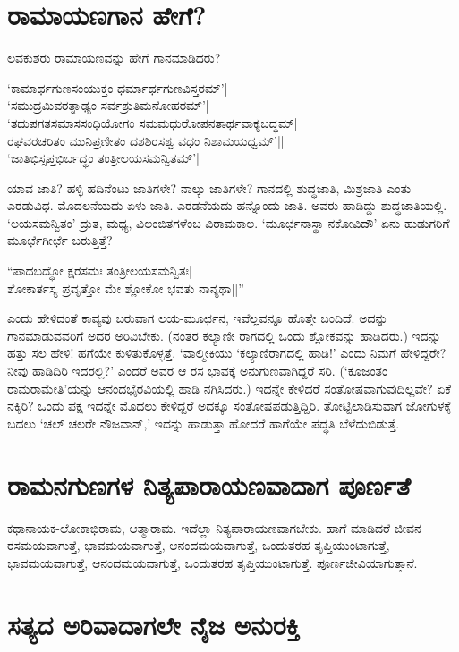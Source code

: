 \section*{ರಾಮಾಯಣಗಾನ ಹೇಗೆ?}

ಲವಕುಶರು ರಾಮಾಯಣವನ್ನು ಹೇಗೆ ಗಾನಮಾಡಿದರು?

\begin{shloka}
`ಕಾಮಾರ್ಥಗುಣಸಂಯುಕ್ತಂ ಧರ್ಮಾರ್ಥಗುಣವಿಸ್ತರಮ್'|\\
`ಸಮುದ್ರಮಿವರತ್ನಾಢ್ಯಂ ಸರ್ವಶ್ರುತಿಮನೋಹರಮ್'|\\
`ತದುಪಗತಸಮಾಸಸಂಧಿಯೋಗಂ ಸಮಮಧುರೋಪನತಾರ್ಥವಾಕ್ಯಬದ್ಧಮ್|\\
ರಘವರಚರಿತಂ ಮುನಿಪ್ರಣೀತಂ ದಶಶಿರಸಶ್ವ ವಧಂ ನಿಶಾಮಯಧ್ವಮ್'||\\
`ಜಾತಿಭಿಸ್ಸಪ್ತಭಿರ್ಬದ್ಧಂ ತಂತ್ರೀಲಯಸಮನ್ವಿತಮ್'|
\end{shloka}

ಯಾವ ಜಾತಿ? ಹಳ್ಳಿ ಹದಿನೆಂಟು 
ಜಾತಿಗಳೇ? ನಾಲ್ಕು ಜಾತಿಗಳೇ? 
ಗಾನದಲ್ಲಿ ಶುದ್ಧಜಾತಿ, 
ಮಿಶ್ರಜಾತಿ ಎಂತು ಎರಡುವಿಧ. 
ಮೊದಲನೆಯದು ಏಳು ಜಾತಿ. 
ಎರಡನೆಯದು ಹನ್ನೊಂದು ಜಾತಿ. 
ಅವರು ಹಾಡಿದ್ದು 
ಶುದ್ಧಜಾತಿಯಲ್ಲಿ. 
`ಲಯಸಮನ್ವಿತಂ' ದ್ರುತ, ಮಧ್ಯ, 
ವಿಲಂಬಿತಗಳೆಂಬ ವಿರಾಮಕಾಲ. 
`ಮೂರ್ಛನಾಸ್ಥಾ ನಕೋವಿದೌ' ಏನು ಹುಡುಗರಿಗೆ ಮೂರ್ಛೆಗೀರ್ಛೆ ಬರುತ್ತಿತ್ತೆ? 

\begin{shloka}
``ಪಾದಬದ್ಧೋ ಕ್ಷರಸಮಃ ತಂತ್ರೀಲಯಸಮನ್ವಿತಃ|\\
ಶೋಕಾರ್ತಸ್ಯ ಪ್ರವೃತ್ತೋ ಮೇ ಶ್ಲೋಕೋ ಭವತು ನಾನ್ಯಥಾ||''
\end{shloka}
ಎಂದು ಹೇಳಿದಂತೆ ಕಾವ್ಯವು 
ಬರುವಾಗ ಲಯ-ಮೂರ್ಛನ, 
ಇವೆಲ್ಲವನ್ನೂ ಹೊತ್ತೇ 
ಬಂದಿದೆ. ಅದನ್ನು 
ಗಾನಮಾಡುವವರಿಗೆ  ಅದರ 
ಅರಿವಿಬೇಕು. (ನಂತರ ಕಲ್ಯಾಣೀ 
ರಾಗದಲ್ಲಿ ಒಂದು ಶ್ಲೋಕವನ್ನು 
ಹಾಡಿದರು.) ಇದನ್ನು ಹತ್ತು ಸಲ 
ಹೇಳಿ! ಹಗೆಯೇ 
ಕುಳಿತುಕೊಳ್ಳತ್ತೆ. 
`ವಾಲ್ಮೀಕಿಯು 
`ಕಲ್ಯಾಣಿರಾಗದಲ್ಲಿ ಹಾಡಿ!' 
ಎಂದು ನಿಮಗೆ ಹೇಳಿದ್ದರೇ? ನೀವು 
ಹಾಡಿದಿರಿ ಇದರಲ್ಲಿ?' ಎಂದರೆ 
ಅವರ ಆ ರಸ ಭಾವಕ್ಕೆ 
ಅನುಗುಣವಾಗಿದ್ದರೆ ಸರಿ. 
(`ಕೂಜಂತಂ ರಾಮರಾಮೇತಿ'ಯನ್ನು ಆನಂದಭೈರವಿಯಲ್ಲಿ ಹಾಡಿ ನಗಿಸಿದರು.) ಇದನ್ನೇ ಕೇಳಿದರೆ ಸಂತೋಷವಾಗುವುದಿಲ್ಲವೇ? ಏಕೆ ನಕ್ಕಿರಿ? ಒಂದು ಪಕ್ಷ ಇದನ್ನೇ ಮೊದಲು ಕೇಳಿದ್ದರೆ ಅದಕ್ಕೂ ಸಂತೋಷಪಡುತ್ತಿದ್ದಿರಿ. ತೋಟ್ಟಿಲಾಡಿಸುವಾಗ ಜೋಗುಳಕ್ಕೆ  ಬದಲು `ಚಲ್ ಚಲರೇ ನೌಜವಾನ್,' ಇದನ್ನು ಹಾಡುತ್ತಾ ಹೋದರೆ ಹಾಗೆಯೇ ಪದ್ಧತಿ ಬೆಳೆದುಬಿಡುತ್ತೆ. 

\section*{ರಾಮನಗುಣಗಳ ನಿತ್ಯಪಾರಾಯಣವಾದಾಗ ಪೂರ್ಣತೆ}

ಕಥಾನಾಯಕ-ಲೋಕಾಭಿರಾಮ, ಆತ್ಮಾರಾಮ. ಇದೆಲ್ಲಾ ನಿತ್ಯಪಾರಾಯಣವಾಗಬೇಕು. ಹಾಗೆ ಮಾಡಿದರೆ ಜೀವನ ರಸಮಯವಾಗುತ್ತೆ, ಭಾವಮಯವಾಗುತ್ತೆ, ಆನಂದಮಯವಾಗುತ್ತೆ, ಒಂದುತರಹ ತೃಪ್ತಿಯುಂಟಾಗುತ್ತೆ, ಭಾವಮಯವಾಗುತ್ತೆ, ಆನಂದಮಯವಾಗುತ್ತೆ, ಒಂದುತರಹ ತೃಪ್ತಿಯುಂಟಾಗುತ್ತೆ. ಪೂರ್ಣಜೀವಿಯಾಗುತ್ತಾನೆ. 

\section*{ಸತ್ಯದ ಅರಿವಾದಾಗಲೇ ನೈಜ ಅನುರಕ್ತಿ}


